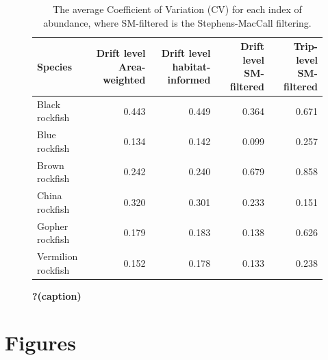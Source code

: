 \documentclass[
  12pt,
  authoryear,
  preprint,
  3p]{elsarticle}
\begin{document}
\begin{figure}

{\centering 

\hypertarget{fig-avgcv-1}{}
\begin{table}

\caption{The average Coefficient of Variation (CV) for 
                  each index of abundance, where SM-filtered is the 
                  Stephens-MacCall filtering.}
\centering
\begin{tabular}[t]{lrrrr}
\toprule
Species & Drift level Area-weighted & Drift level habitat-informed & Drift level SM-filtered & Trip-level SM-filtered\\
\midrule
Black rockfish & 0.443 & 0.449 & 0.364 & 0.671\\
Blue rockfish & 0.134 & 0.142 & 0.099 & 0.257\\
Brown rockfish & 0.242 & 0.240 & 0.679 & 0.858\\
China rockfish & 0.320 & 0.301 & 0.233 & 0.151\\
Gopher rockfish & 0.179 & 0.183 & 0.138 & 0.626\\
\addlinespace
Vermilion rockfish & 0.152 & 0.178 & 0.133 & 0.238\\
\bottomrule
\end{tabular}
\end{table}

}

\caption{\label{fig-avgcv}\textbf{?(caption)}}

\end{figure}

\FloatBarrier

\hypertarget{figures}{%
\section{Figures}\label{figures}}
\end{document}
